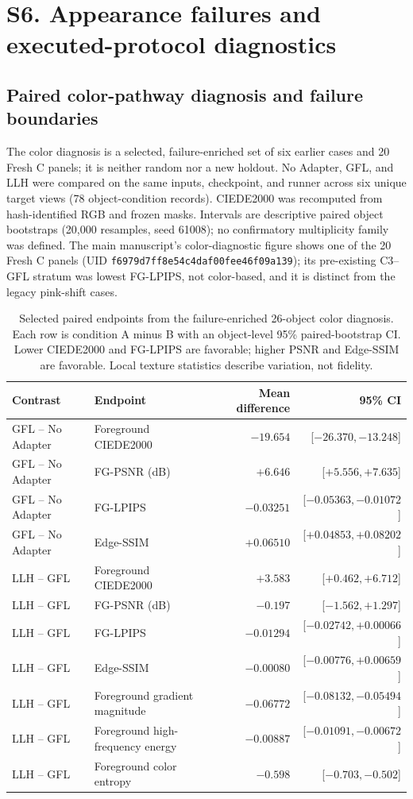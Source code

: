\documentclass[11pt]{article}
\begin{document}
\FloatBarrier
\section*{S6. Appearance failures and executed-protocol diagnostics}
\label{supp:group6}

\subsection*{Paired color-pathway diagnosis and failure boundaries}
The color diagnosis is a selected, failure-enriched set of six earlier cases and 20 Fresh C panels; it is neither random nor a new holdout. No Adapter, GFL, and LLH were compared on the same inputs, checkpoint, and runner across six unique target views (78 object-condition records). CIEDE2000 was recomputed from hash-identified RGB and frozen masks. Intervals are descriptive paired object bootstraps (20,000 resamples, seed 61008); no confirmatory multiplicity family was defined. The main manuscript's color-diagnostic figure shows one of the 20 Fresh C panels (UID \texttt{f6979d7ff8e54c4daf00fee46f09a139}); its pre-existing C3--GFL stratum was lowest FG-LPIPS, not color-based, and it is distinct from the legacy pink-shift cases.

\begin{table}[ht]
\centering\scriptsize
\caption{Selected paired endpoints from the failure-enriched 26-object color diagnosis. Each row is condition A minus B with an object-level 95\% paired-bootstrap CI. Lower CIEDE2000 and FG-LPIPS are favorable; higher PSNR and Edge-SSIM are favorable. Local texture statistics describe variation, not fidelity.}
\label{tab:color-diagnostic}
\begin{tabular}{llrr}
\toprule Contrast & Endpoint & Mean difference & 95\% CI \\
\midrule
GFL -- No Adapter & Foreground CIEDE2000 & $-19.654$ & [$-26.370,-13.248$] \\
GFL -- No Adapter & FG-PSNR (dB) & $+6.646$ & [$+5.556,+7.635$] \\
GFL -- No Adapter & FG-LPIPS & $-0.03251$ & [$-0.05363,-0.01072$] \\
GFL -- No Adapter & Edge-SSIM & $+0.06510$ & [$+0.04853,+0.08202$] \\
LLH -- GFL & Foreground CIEDE2000 & $+3.583$ & [$+0.462,+6.712$] \\
LLH -- GFL & FG-PSNR (dB) & $-0.197$ & [$-1.562,+1.297$] \\
LLH -- GFL & FG-LPIPS & $-0.01294$ & [$-0.02742,+0.00066$] \\
LLH -- GFL & Edge-SSIM & $-0.00080$ & [$-0.00776,+0.00659$] \\
LLH -- GFL & Foreground gradient magnitude & $-0.06772$ & [$-0.08132,-0.05494$] \\
LLH -- GFL & Foreground high-frequency energy & $-0.00887$ & [$-0.01091,-0.00672$] \\
LLH -- GFL & Foreground color entropy & $-0.598$ & [$-0.703,-0.502$] \\
\bottomrule
\end{tabular}
\end{table}
\end{document}
